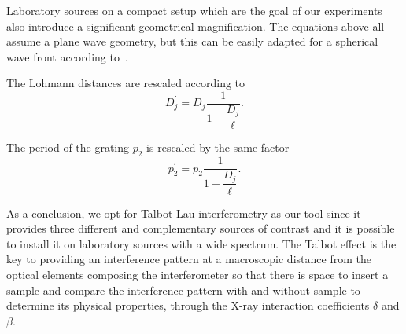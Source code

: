 Laboratory sources on a compact setup which are the goal of our experiments
also introduce a significant geometrical magnification. The equations above
all assume a plane wave geometry, but this can be easily adapted for a
spherical wave front according to~\cite{Engelhardt2008}.

The Lohmann distances are rescaled according to
\begin{equation}
    D_j^\prime = D_j \frac{1}{1 -
        \dfrac{D_j}{\ell}}.\label{eq:magnification-distance}
\end{equation}

The period of the grating $p_2$ is rescaled by the same factor
\begin{equation}
    p_2^\prime = p_2 \frac{1}{1 -
        \dfrac{D_j}{\ell}}.\label{eq:magnification}
\end{equation}

As a conclusion, we opt for Talbot-Lau interferometry as our tool since it
provides three different and complementary sources of contrast and it is
possible to install it on laboratory sources with a wide spectrum. The
Talbot effect is the key to providing an interference pattern at a
macroscopic distance from the optical elements composing the interferometer
so that there is space to insert a sample and compare the interference
pattern with and without sample to determine its physical properties,
through the X-ray interaction coefficients $\delta$ and $\beta$.
